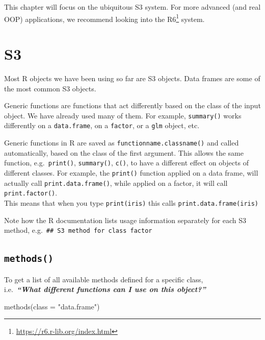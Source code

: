 \documentclass[
]{book}
\newenvironment{Shaded}{\begin{snugshade}}{\end{snugshade}}
\newcommand{\AttributeTok}[1]{\textcolor[rgb]{0.77,0.63,0.00}{#1}}
\newcommand{\FunctionTok}[1]{\textcolor[rgb]{0.00,0.00,0.00}{#1}}
\newcommand{\NormalTok}[1]{#1}
\newcommand{\StringTok}[1]{\textcolor[rgb]{0.31,0.60,0.02}{#1}}
\DeclareRobustCommand{\href}[2]{#2\footnote{\url{#1}}}
\renewcommand{\href}[2]{#2\footnote{\url{#1}}}
\begin{document}
This chapter will focus on the ubiquitous S3 system. For more advanced (and real OOP) applications, we recommend looking into the \href{https://r6.r-lib.org/index.html}{R6} system.

\hypertarget{s3}{%
\section{S3}\label{s3}}

Most R objects we have been using so far are S3 objects. Data frames are some of the most common S3 objects.

Generic functions are functions that act differently based on the class of the input object. We have already used many of them. For example, \texttt{summary()} works differently on a \texttt{data.frame}, on a \texttt{factor}, or a \texttt{glm} object, etc.

Generic functions in R are saved as \texttt{functionname.classname()} and called automatically, based on the class of the first argument. This allows the same function, e.g.~\texttt{print()}, \texttt{summary()}, \texttt{c()}, to have a different effect on objects of different classes.
For example, the \texttt{print()} function applied on a data frame, will actually call \texttt{print.data.frame()}, while applied on a factor, it will call \texttt{print.factor()}.\\
This means that when you type \texttt{print(iris)} this calls \texttt{print.data.frame(iris)}

Note how the R documentation lists usage information separately for each S3 method, e.g.~\texttt{\#\#\ S3\ method\ for\ class\ \textquotesingle{}factor\textquotesingle{}}

\hypertarget{s3methods}{%
\subsection{\texorpdfstring{\texttt{methods()}}{methods()}}\label{s3methods}}

To get a list of all available methods defined for a specific class,\\
i.e.~\textbf{\emph{``What different functions can I use on this object?''}}

\begin{Shaded}
\begin{Highlighting}[]
\FunctionTok{methods}\NormalTok{(}\AttributeTok{class =} \StringTok{"data.frame"}\NormalTok{)}
\end{Highlighting}
\end{Shaded}
\end{document}
